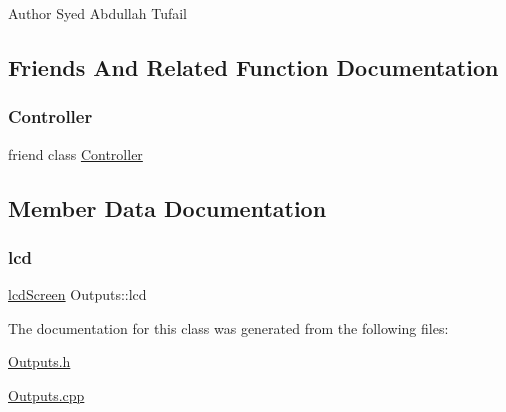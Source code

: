 \begin{DoxyAuthor}{Author}
Syed Abdullah Tufail 
\end{DoxyAuthor}


\subsection{Friends And Related Function Documentation}
\mbox{\label{classOutputs_ac3456fd331a58b288082abca310c7a99}} 
\subsubsection{\texorpdfstring{Controller}{Controller}}
{\footnotesize\ttfamily friend class \hyperlink{classController}{Controller}\hspace{0.3cm}{\ttfamily [friend]}}



\subsection{Member Data Documentation}
\mbox{\label{classOutputs_a75eb0439cced956d5756a3d965e528d0}} 
\subsubsection{\texorpdfstring{lcd}{lcd}}
{\footnotesize\ttfamily \hyperlink{classlcdScreen}{lcd\+Screen} Outputs\+::lcd\hspace{0.3cm}{\ttfamily [private]}}



The documentation for this class was generated from the following files\+:\begin{DoxyCompactItemize}
\item 
\hyperlink{Outputs_8h}{Outputs.\+h}\item 
\hyperlink{Outputs_8cpp}{Outputs.\+cpp}\end{DoxyCompactItemize}
